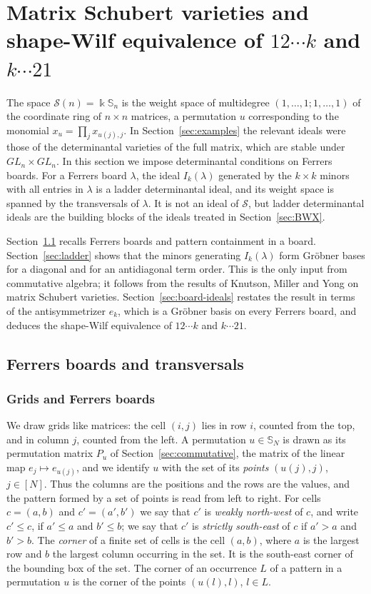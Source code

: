 \documentclass[11pt]{amsart}
\theoremstyle{definition}
\theoremstyle{remark}
\newcommand{\bS}{\mathbb{S}}
\newcommand{\kk}{\Bbbk}
\newcommand{\cS}{\mathscr{S}}
\begin{document}
\section{Matrix Schubert varieties and shape-Wilf equivalence of \texorpdfstring{$12\cdots k$ and $k\cdots21$}{12...k and k...21}}\label{sec:ferrers}

The space $\cS(n)=\kk\bS_n$ is the weight space of multidegree $(1,\dots,1;1,\dots,1)$ of the coordinate ring of $n\times n$ matrices, a permutation $u$ corresponding to the monomial $x_u=\prod_jx_{u(j),j}$. In Section~\ref{sec:examples} the relevant ideals were those of the determinantal varieties of the full matrix, which are stable under $GL_n\times GL_n$. In this section we impose determinantal conditions on Ferrers boards. For a Ferrers board $\lambda$, the ideal $I_k(\lambda)$ generated by the $k\times k$ minors with all entries in $\lambda$ is a ladder determinantal ideal, and its weight space is spanned by the transversals of $\lambda$. It is not an ideal of $\cS$, but ladder determinantal ideals are the building blocks of the ideals treated in Section~\ref{sec:BWX}.

Section~\ref{sec:boards} recalls Ferrers boards and pattern containment in a board. Section~\ref{sec:ladder} shows that the minors generating $I_k(\lambda)$ form Gr\"obner bases for a diagonal and for an antidiagonal term order. This is the only input from commutative algebra; it follows from the results of Knutson, Miller and Yong on matrix Schubert varieties. Section~\ref{sec:board-ideals} restates the result in terms of the antisymmetrizer $e_k$, which is a Gr\"obner basis on every Ferrers board, and deduces the shape-Wilf equivalence of $12\cdots k$ and $k\cdots21$.

\subsection{Ferrers boards and transversals}\label{sec:boards}

\subsubsection{Grids and Ferrers boards}
We draw grids like matrices: the cell $(i,j)$ lies in row $i$, counted from the top, and in column $j$, counted from the left. A permutation $u\in\bS_N$ is drawn as its permutation matrix $P_u$ of Section~\ref{sec:commutative}, the matrix of the linear map $e_j\mapsto e_{u(j)}$, and we identify $u$ with the set of its \emph{points} $(u(j),j)$, $j\in[N]$. Thus the columns are the positions and the rows are the values, and the pattern formed by a set of points is read from left to right. For cells $c=(a,b)$ and $c'=(a',b')$ we say that $c'$ is \emph{weakly north-west} of $c$, and write $c'\le c$, if $a'\le a$ and $b'\le b$; we say that $c'$ is \emph{strictly south-east} of $c$ if $a'>a$ and $b'>b$. The \emph{corner} of a finite set of cells is the cell $(a,b)$, where $a$ is the largest row and $b$ the largest column occurring in the set. It is the south-east corner of the bounding box of the set. The corner of an occurrence $L$ of a pattern in a permutation $u$ is the corner of the points $(u(l),l)$, $l\in L$.
\end{document}
